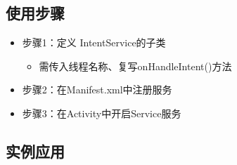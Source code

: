 \documentclass[9pt, b5paper]{article}
\begin{document}
\subsection{使用步骤}
\label{sec-4-5}
\begin{itemize}
\item 步骤1：定义 IntentService的子类
\begin{itemize}
\item 需传入线程名称、复写onHandleIntent()方法
\end{itemize}
\item 步骤2：在Manifest.xml中注册服务
\item 步骤3：在Activity中开启Service服务
\end{itemize}
\subsection{实例应用}
\label{sec-4-6}
\end{document}
